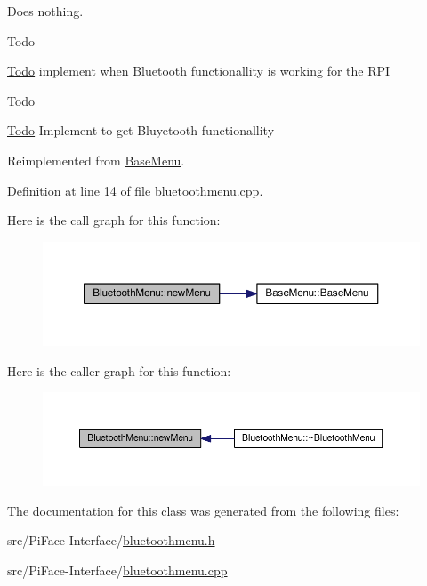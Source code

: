 Does nothing. 

\begin{DoxyRefDesc}{Todo}
\item[\hyperlink{todo__todo000021}{Todo}]implement when Bluetooth functionallity is working for the R\+PI \end{DoxyRefDesc}


\begin{DoxyRefDesc}{Todo}
\item[\hyperlink{todo__todo000020}{Todo}]Implement to get Bluyetooth functionallity \end{DoxyRefDesc}


Reimplemented from \hyperlink{classBaseMenu_a722bb88987e9a64015c59f3419d89704}{Base\+Menu}.



Definition at line \hyperlink{bluetoothmenu_8cpp_source_l00014}{14} of file \hyperlink{bluetoothmenu_8cpp_source}{bluetoothmenu.\+cpp}.



Here is the call graph for this function\+:
\nopagebreak
\begin{figure}[H]
\begin{center}
\leavevmode
\includegraphics[width=350pt]{classBluetoothMenu_a0fd16ad5a39ce3624613ad7834a55565_cgraph}
\end{center}
\end{figure}




Here is the caller graph for this function\+:
\nopagebreak
\begin{figure}[H]
\begin{center}
\leavevmode
\includegraphics[width=350pt]{classBluetoothMenu_a0fd16ad5a39ce3624613ad7834a55565_icgraph}
\end{center}
\end{figure}




The documentation for this class was generated from the following files\+:\begin{DoxyCompactItemize}
\item 
src/\+Pi\+Face-\/\+Interface/\hyperlink{bluetoothmenu_8h}{bluetoothmenu.\+h}\item 
src/\+Pi\+Face-\/\+Interface/\hyperlink{bluetoothmenu_8cpp}{bluetoothmenu.\+cpp}\end{DoxyCompactItemize}
